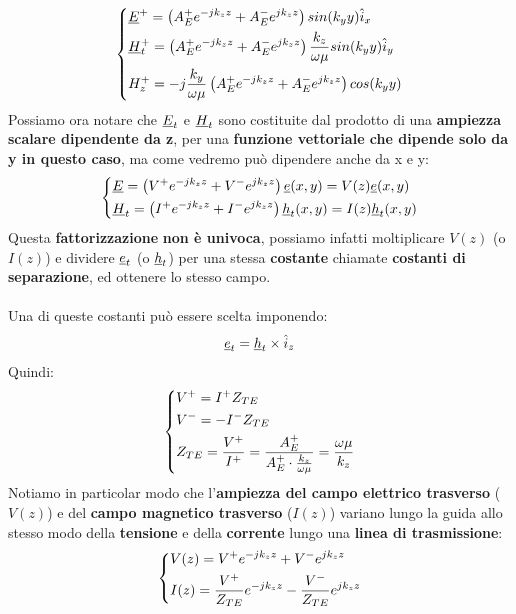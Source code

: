 \begin{equation*}
\begin{dcases}
    \underline{E}^+ = \left(A^+_E e^{-j k_z z} +  A^-_E e^{j k_z z} \right)   sin(k_y y) \hat{i}_x\\
    \underline{H}^+_t = \left(A^+_E e^{-j k_z z} +  A^-_E e^{j k_z z} \right) \frac{k_z}{\omega \mu} sin(k_y y) \hat{i}_y\\
    H^+_z = -j \frac{k_y}{\omega \mu} \left(A^+_E e^{-j k_z z} +  A^-_E e^{j k_z z} \right) cos(k_y y) 
\end{dcases}
\end{equation*}
Possiamo ora notare che $\underline{E}_t$ e $\underline{H}_t$ sono costituite dal prodotto di una \textbf{ampiezza scalare dipendente da z}, per una \textbf{funzione vettoriale che dipende solo da y in questo caso}, ma come vedremo può dipendere anche da x e y:
\begin{equation*}
    \begin{dcases}
        \underline{E} = \left(V^+ e^{-j k_z z} +  V^- e^{j k_z z} \right) \underline{e}(x,y) = V(z) \underline{e}(x,y)\\
        \underline{H}_t = \left(I^+ e^{-j k_z z} + I^-  e^{j k_z z} \right) \underline{h}_t(x,y) = I(z) \underline{h}_t(x,y)
    \end{dcases}
\end{equation*}
Questa \textbf{fattorizzazione} \textbf{non è univoca}, possiamo infatti moltiplicare $V(z)$ (o $I(z)$) e dividere $\underline{e}_t$ (o $\underline{h}_t$) per una stessa \textbf{costante} chiamate \textbf{costanti di separazione}, ed ottenere lo stesso campo.\\ \\
Una di queste costanti può essere scelta imponendo:
\begin{equation*}
    \underline{e}_t = \underline{h}_t \times \hat{i}_z
\end{equation*}
Quindi:
\begin{equation*}
    \begin{dcases}
        V^+ = I^+ Z_{TE}\\
        V^- =- I^- Z_{TE}\\
        Z_{TE} = \frac{V^+}{I^+} = \frac{A^+_E}{A^+_E \cdot \frac{k_z}{\omega \mu}} = \frac{\omega \mu}{k_z}
    \end{dcases}
\end{equation*}
Notiamo in particolar modo che l'\textbf{ampiezza del campo elettrico trasverso} ($V(z)$) e del \textbf{campo magnetico trasverso} ($I(z)$) variano lungo la guida allo stesso modo della \textbf{tensione} e della \textbf{corrente} lungo una \textbf{linea di trasmissione}:
\begin{equation*}
    \begin{dcases}
        V(z) =V^+ e^{-jk_z z} + V^- e^{jk_z z}\\
        I(z) =\frac{V^+}{Z_{TE}} e^{-jk_z z} - \frac{V^-}{Z_{TE}} e^{jk_z z}
    \end{dcases}
\end{equation*}
